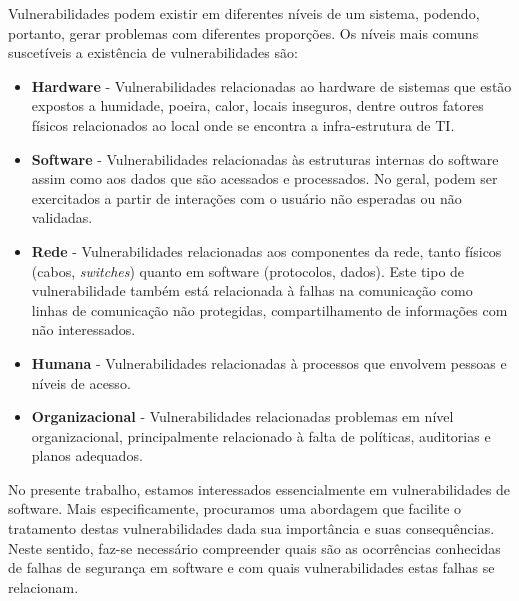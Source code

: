 %

Vulnerabilidades podem existir em diferentes níveis de um sistema, podendo, portanto, gerar problemas com diferentes proporções. Os níveis mais comuns suscetíveis a existência de vulnerabilidades são:

%

\begin{itemize}
\item \textbf{Hardware} - Vulnerabilidades relacionadas ao hardware de sistemas que estão expostos a humidade, poeira, calor, locais inseguros, dentre outros fatores físicos relacionados ao local onde se encontra a infra-estrutura de TI.
\item \textbf{Software} - Vulnerabilidades relacionadas às estruturas internas do software assim como aos dados que são acessados e processados. No geral, podem ser exercitados a partir de interações com o usuário não esperadas ou não validadas.
\item \textbf{Rede} - Vulnerabilidades relacionadas aos componentes da rede, tanto físicos (cabos, \emph{switches}) quanto em software (protocolos, dados). Este tipo de vulnerabilidade também está relacionada à falhas na comunicação como linhas de comunicação não protegidas, compartilhamento de informações com não interessados.
\item \textbf{Humana} - Vulnerabilidades relacionadas à processos que envolvem pessoas e níveis de acesso.
\item \textbf{Organizacional} - Vulnerabilidades relacionadas problemas em nível organizacional, principalmente relacionado à falta de políticas, auditorias e planos adequados.
\end{itemize}

%

No presente trabalho, estamos interessados essencialmente em vulnerabilidades de software. Mais especificamente, procuramos uma abordagem que facilite o tratamento destas vulnerabilidades dada sua importância e suas consequências. Neste sentido, faz-se necessário compreender quais são as ocorrências conhecidas de falhas de segurança em software e com quais vulnerabilidades estas falhas se relacionam.

%

